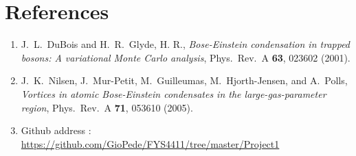 \documentclass[10pt,a4paper,titlepage]{article}
\begin{document}
\section*{References}
\begin{enumerate}
\item J.~L.~DuBois and H.~R.~Glyde, H. R., {\em Bose-Einstein condensation in trapped bosons: A variational Monte Carlo analysis},
Phys.~Rev.~A {\bf 63}, 023602 (2001).

\item J.~K.~Nilsen,  J.~Mur-Petit, M.~Guilleumas, M.~Hjorth-Jensen, and A.~Polls, {\em Vortices in atomic Bose-Einstein condensates in the large-gas-parameter region},
Phys.~Rev.~A {\bf 71}, 053610 (2005).

\item Github address : \url {https://github.com/GioPede/FYS4411/tree/master/Project1}

\end{enumerate}
\end{document}
